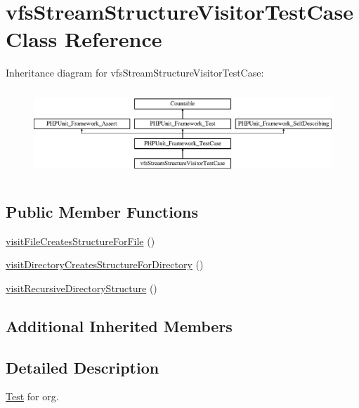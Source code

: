 \hypertarget{classorg_1_1bovigo_1_1vfs_1_1visitor_1_1vfs_stream_structure_visitor_test_case}{}\section{vfs\+Stream\+Structure\+Visitor\+Test\+Case Class Reference}
\label{classorg_1_1bovigo_1_1vfs_1_1visitor_1_1vfs_stream_structure_visitor_test_case}
Inheritance diagram for vfs\+Stream\+Structure\+Visitor\+Test\+Case\+:\begin{figure}[H]
\begin{center}
\leavevmode
\includegraphics[height=3.303835cm]{classorg_1_1bovigo_1_1vfs_1_1visitor_1_1vfs_stream_structure_visitor_test_case}
\end{center}
\end{figure}
\subsection*{Public Member Functions}
\begin{DoxyCompactItemize}
\item 
\mbox{\hyperlink{classorg_1_1bovigo_1_1vfs_1_1visitor_1_1vfs_stream_structure_visitor_test_case_a02ab57049900a70ecbb056544c563f48}{visit\+File\+Creates\+Structure\+For\+File}} ()
\item 
\mbox{\hyperlink{classorg_1_1bovigo_1_1vfs_1_1visitor_1_1vfs_stream_structure_visitor_test_case_a3609be3bd496931e362c0ea0fbf5d184}{visit\+Directory\+Creates\+Structure\+For\+Directory}} ()
\item 
\mbox{\hyperlink{classorg_1_1bovigo_1_1vfs_1_1visitor_1_1vfs_stream_structure_visitor_test_case_a202111a702388c51ecd2374ffc20fa6c}{visit\+Recursive\+Directory\+Structure}} ()
\end{DoxyCompactItemize}
\subsection*{Additional Inherited Members}


\subsection{Detailed Description}
\mbox{\hyperlink{class_test}{Test}} for org.

